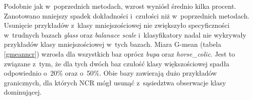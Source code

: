  Podobnie jak w~poprzednich metodach, wzrost wyniósł średnio kilka procent. Zanotowano mniejszy spadek dokładności i~czułości niż w~poprzednich metodach. Usunięcie przykładów z~klasy mniejszościowej nie zwiększyło specyficzności w~trudnych bazach \textit{glass} oraz \textit{balanace scale} i~klasyfikatory nadal nie wykrywały przykładów klasy mniejszościowej w~tych bazach. Miara G-mean (tabela \ref{gmeanncr}) wzrosła dla wszystkich baz oprócz \textit{bupa} oraz \textit{horse\_colic}. Jest to związane z~tym, że dla tych dwóch baz czułość klasy większościowej spadła odpowiednio o~20\% oraz o~50\%. Obie bazy zawierają dużo przykładów granicznych, dla których NCR mógł usunąć z~sąsiedztwa obserwacje klasy dominującej.

			\begin{table}[H]
				\tiny
				\begin{center}
\end{center}
\end{table}
